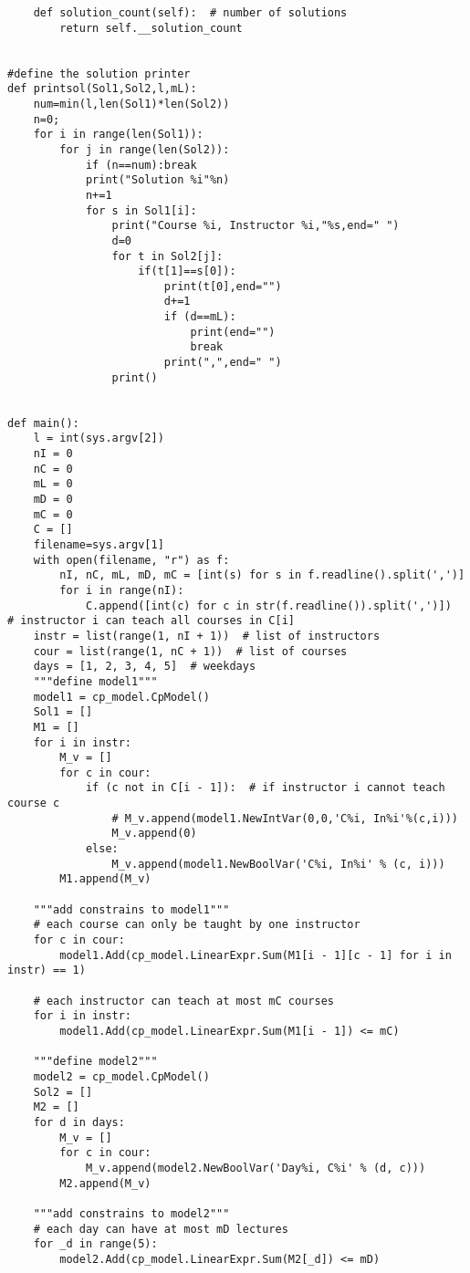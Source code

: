 \documentclass{article}
\begin{document}
\begin{verbatim}
    def solution_count(self):  # number of solutions
        return self.__solution_count


#define the solution printer
def printsol(Sol1,Sol2,l,mL):
    num=min(l,len(Sol1)*len(Sol2))
    n=0;
    for i in range(len(Sol1)):
        for j in range(len(Sol2)):
            if (n==num):break
            print("Solution %i"%n)
            n+=1
            for s in Sol1[i]:
                print("Course %i, Instructor %i,"%s,end=" ")
                d=0
                for t in Sol2[j]:
                    if(t[1]==s[0]):
                        print(t[0],end="")
                        d+=1
                        if (d==mL):
                            print(end="")
                            break
                        print(",",end=" ")
                print()


def main():
    l = int(sys.argv[2])
    nI = 0
    nC = 0
    mL = 0
    mD = 0
    mC = 0
    C = []
    filename=sys.argv[1]
    with open(filename, "r") as f:
        nI, nC, mL, mD, mC = [int(s) for s in f.readline().split(',')]
        for i in range(nI):
            C.append([int(c) for c in str(f.readline()).split(',')])  # instructor i can teach all courses in C[i]
    instr = list(range(1, nI + 1))  # list of instructors
    cour = list(range(1, nC + 1))  # list of courses
    days = [1, 2, 3, 4, 5]  # weekdays
    """define model1"""
    model1 = cp_model.CpModel()
    Sol1 = []
    M1 = []
    for i in instr:
        M_v = []
        for c in cour:
            if (c not in C[i - 1]):  # if instructor i cannot teach course c
                # M_v.append(model1.NewIntVar(0,0,'C%i, In%i'%(c,i)))
                M_v.append(0)
            else:
                M_v.append(model1.NewBoolVar('C%i, In%i' % (c, i)))
        M1.append(M_v)

    """add constrains to model1"""
    # each course can only be taught by one instructor
    for c in cour:
        model1.Add(cp_model.LinearExpr.Sum(M1[i - 1][c - 1] for i in instr) == 1)

    # each instructor can teach at most mC courses
    for i in instr:
        model1.Add(cp_model.LinearExpr.Sum(M1[i - 1]) <= mC)

    """define model2"""
    model2 = cp_model.CpModel()
    Sol2 = []
    M2 = []
    for d in days:
        M_v = []
        for c in cour:
            M_v.append(model2.NewBoolVar('Day%i, C%i' % (d, c)))
        M2.append(M_v)

    """add constrains to model2"""
    # each day can have at most mD lectures
    for _d in range(5):
        model2.Add(cp_model.LinearExpr.Sum(M2[_d]) <= mD)


\end{verbatim}
\end{document}
